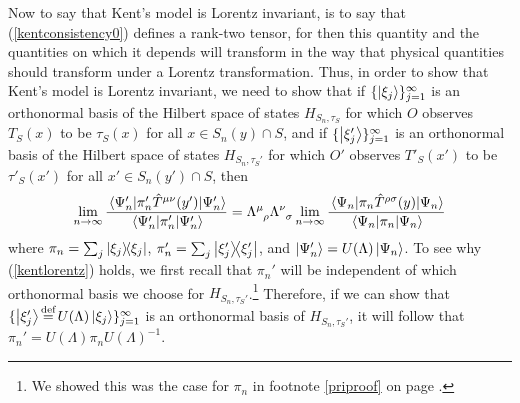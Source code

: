 Now to say that Kent's model is Lorentz invariant, is to say that (\ref{kentconsistency0}) defines a rank-two tensor, for then this quantity and the quantities on which it depends will transform in the way that physical quantities should transform under a Lorentz transformation. Thus, in order to show that Kent's model is Lorentz invariant, we need to show that if $\{\ket{\xi_j}\}_{j=1}^\infty$ is an orthonormal basis of the Hilbert space of states $H_{S_n,\tau_S}$ for which $O$ observes $T_S(x)$ to be $\tau_S(x)$ for all $x\in S_n(y)\cap S$, and if $\{\ket{\xi_j'}\}_{j=1}^\infty$ is an orthonormal basis of the Hilbert space of states $H_{S_n,\tau_S'}$ for which $O'$ observes $T'_S(x')$ to be $\tau'_S(x')$ for all $x'\in S_n(y')\cap S$, then
\begin{equation}\label{kentlorentz}
\lim_{n\rightarrow\infty}\frac{\ev{\pi_n'\hat{T}^{\mu\nu}(y')}{\Psi_n'}}{\ev{\pi_n'}{\Psi_n'}}=\Lambda\indices{^\mu_\rho}\Lambda\indices{^\nu_\sigma} \lim_{n\rightarrow\infty}\frac{\ev{\pi_n\hat{T}^{\rho\sigma}(y)}{\Psi_n}}{\ev{\pi_n}{\Psi_n}}
\end{equation}
where $\pi_n=\sum_j\dyad{\xi_j}$, $\pi_n'=\sum_j\dyad{\xi_j'}$, and $\ket{\Psi_n'}=U(\Lambda)\ket{\Psi_n}$. To see why (\ref{kentlorentz}) holds, we first recall that $\pi_n'$ will be independent of which orthonormal basis we choose for $H_{S_n,\tau_S'}$.\footnote{We showed this was the case for $\pi_n$ in footnote \ref{priproof} on page \pageref{priproof}.} Therefore, if we can show that $\{\ket{\xi_j'}\myeq U(\Lambda)\ket{\xi_j}\}_{j=1}^\infty$ is an orthonormal basis of $H_{S_n,\tau_S'}$, it will follow that $\pi_n'=U(\Lambda)\pi_nU(\Lambda)^{-1}$. 

